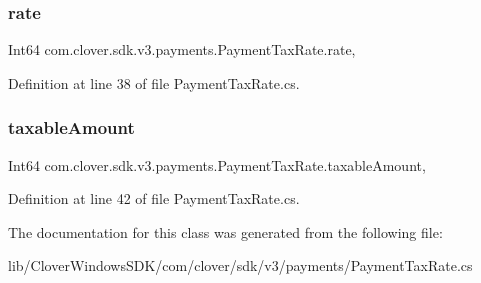 \subsubsection{\texorpdfstring{rate}{rate}}
{\footnotesize\ttfamily Int64 com.\+clover.\+sdk.\+v3.\+payments.\+Payment\+Tax\+Rate.\+rate\hspace{0.3cm}{\ttfamily [get]}, {\ttfamily [set]}}



Definition at line 38 of file Payment\+Tax\+Rate.\+cs.

\mbox{\label{classcom_1_1clover_1_1sdk_1_1v3_1_1payments_1_1_payment_tax_rate_a8ff57f64008115b286cfe5c17621f23a}} 
\subsubsection{\texorpdfstring{taxable\+Amount}{taxableAmount}}
{\footnotesize\ttfamily Int64 com.\+clover.\+sdk.\+v3.\+payments.\+Payment\+Tax\+Rate.\+taxable\+Amount\hspace{0.3cm}{\ttfamily [get]}, {\ttfamily [set]}}



Definition at line 42 of file Payment\+Tax\+Rate.\+cs.



The documentation for this class was generated from the following file\+:\begin{DoxyCompactItemize}
\item 
lib/\+Clover\+Windows\+S\+D\+K/com/clover/sdk/v3/payments/Payment\+Tax\+Rate.\+cs\end{DoxyCompactItemize}
